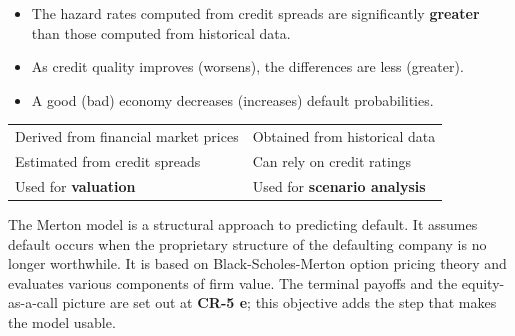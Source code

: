 
\begin{crkeybox}
\begin{itemize}
\item The hazard rates computed from credit spreads are significantly
\textbf{greater} than those computed from historical data.
\item As credit quality improves (worsens), the differences are less (greater).
\item A good (bad) economy decreases (increases) default probabilities.
\end{itemize}
\end{crkeybox}


\begin{center}
\footnotesize
\begin{tabular}{L{7.0cm} L{7.5cm}}
\toprule
{} &  \\
\midrule
Derived from financial market prices & Obtained from historical data \\
Estimated from credit spreads & Can rely on credit ratings \\
Used for \textbf{valuation} & Used for \textbf{scenario analysis} \\
\bottomrule
\end{tabular}
\end{center}


The Merton model is a structural approach to predicting default. It assumes
default occurs when the proprietary structure of the defaulting company is no
longer worthwhile. It is based on Black-Scholes-Merton option pricing theory and
evaluates various components of firm value. The terminal payoffs and the
equity-as-a-call picture are set out at \textbf{CR-5 e}; this objective adds the
step that makes the model usable.

